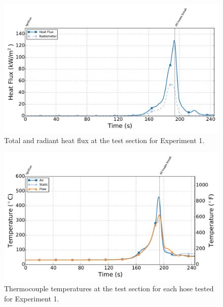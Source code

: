 \documentclass[letterpaper,11pt]{texMemo} %
\begin{document}
\begin{figure}[!ht]
\centering
\includegraphics[width=\columnwidth]{../Figures/Hose_Figures/Test_60_West_80915_Heat_Flux_2}
\caption{Total and radiant heat flux at the test section for Experiment 1.}
\label{fig:hf_A3_test60}
\end{figure}

\begin{figure}[!ht]
\centering
\includegraphics[width=\columnwidth]{../Figures/Hose_Figures/Test_60_West_80915_TC_Gear_2}
\caption{Thermocouple temperatures at the test section for each hose tested for Experiment 1.}
\label{fig:hose_A3_test60}
\end{figure}
\end{document}
